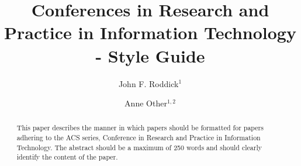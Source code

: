 \documentclass{CRPITStyle}
\begin{document}
\title{Conferences in Research and Practice in Information Technology - Style Guide}
\author{John F. Roddick$^1$
\and 
Anne Other$^{1, 2}$}


\maketitle




\newcommand\conferencenameandplace{Twenty-Ninth Australasian Computer Science Conference (ACSC2006), Hobart, Australia}
\newcommand\volumenumber{48}
\newcommand\conferenceyear{2006}
\newcommand\editorname{Vladimir Estivill-Castro and Gillian Dobbie}
\toappearstandard 


\begin{abstract}
This paper describes the manner in which papers should be formatted for papers adhering to the ACS series, Conference in Research and Practice in Information Technology.  The abstract should be a maximum of 250 words and should clearly identify the content of the paper.  
\end{abstract}
\vspace{.1in}
\end{document}
